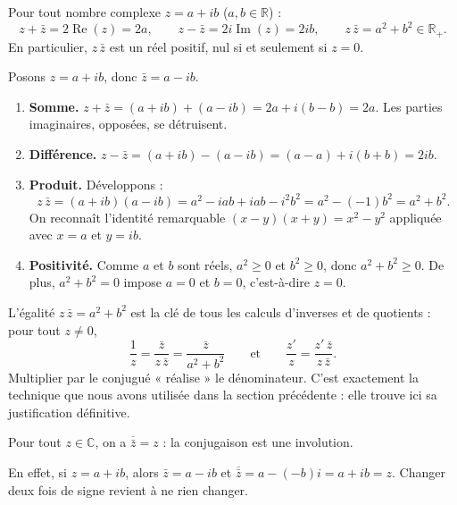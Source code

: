 \documentclass[11pt]{article}
\newcommand{\cle}[1]{{\popxbold\color{popdark}#1}}
\begin{document}
\begin{propriete}
Pour tout nombre complexe $z = a+ib$ ($a, b \in \mathbb{R}$) :
\[ z + \bar{z} = 2\operatorname{Re}(z) = 2a, \qquad z - \bar{z} = 2i\operatorname{Im}(z) = 2ib, \qquad z\,\bar{z} = a^2 + b^2 \in \mathbb{R}_{+}. \]
En particulier, $z\,\bar{z}$ est un réel positif, nul si et seulement si $z = 0$.
\end{propriete}

\begin{experience}
Posons $z = a+ib$, donc $\bar{z} = a - ib$.
\begin{enumerate}
\item \textbf{Somme.} $z + \bar{z} = (a+ib) + (a-ib) = 2a + i(b-b) = 2a$. Les parties imaginaires, opposées, se détruisent.
\item \textbf{Différence.} $z - \bar{z} = (a+ib) - (a-ib) = (a-a) + i(b+b) = 2ib$.
\item \textbf{Produit.} Développons :
\[ z\,\bar{z} = (a+ib)(a-ib) = a^2 - iab + iab - i^2 b^2 = a^2 - (-1)b^2 = a^2 + b^2. \]
On reconnaît l'identité remarquable $(x-y)(x+y) = x^2 - y^2$ appliquée avec $x = a$ et $y = ib$.
\item \textbf{Positivité.} Comme $a$ et $b$ sont réels, $a^2 \geq 0$ et $b^2 \geq 0$, donc $a^2 + b^2 \geq 0$. De plus, $a^2+b^2 = 0$ impose $a = 0$ et $b = 0$, c'est-à-dire $z = 0$.
\end{enumerate}
\end{experience}

\begin{aretenir}
L'égalité $z\,\bar{z} = a^2+b^2$ est la clé de tous les calculs d'inverses et de quotients : pour tout $z \neq 0$,
\[ \frac{1}{z} = \frac{\bar{z}}{z\,\bar{z}} = \frac{\bar{z}}{a^2+b^2} \qquad \text{et} \qquad \frac{z'}{z} = \frac{z'\,\bar{z}}{z\,\bar{z}}. \]
Multiplier par le conjugué « réalise » le dénominateur. C'est exactement la technique que nous avons utilisée dans la section précédente : elle trouve ici sa justification définitive.
\end{aretenir}

\begin{propriete}
Pour tout $z \in \mathbb{C}$, on a $\overline{\bar{z}} = z$ : la conjugaison est une \cle{involution}.
\end{propriete}

En effet, si $z = a+ib$, alors $\bar{z} = a-ib$ et $\overline{\bar{z}} = a - (-b)i = a + ib = z$. Changer deux fois de signe revient à ne rien changer.
\end{document}
